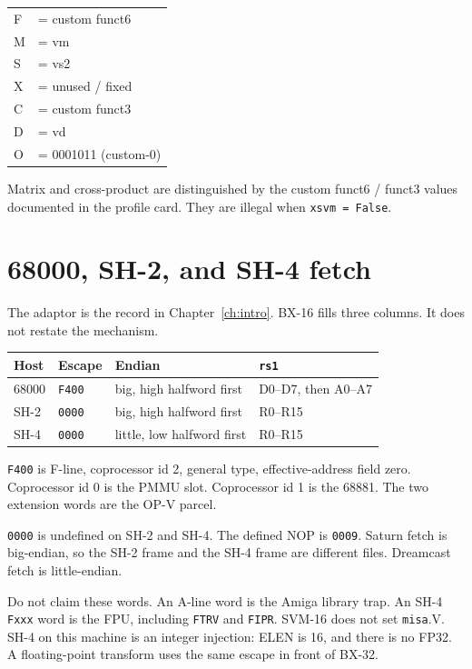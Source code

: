 \vspace{1.4ex}
\begin{center}
\begin{tabular}{@{}ll@{}}
F & = custom funct6 \\
M & = vm \\
S & = vs2 \\
X & = unused / fixed \\
C & = custom funct3 \\
D & = vd \\
O & = 0001011 (custom-0) \\
\end{tabular}
\end{center}

Matrix and cross-product are distinguished by the custom funct6 / funct3 values documented in the profile card. They are illegal when \texttt{xsvm = False}.

\section{68000, SH-2, and SH-4 fetch}

The adaptor is the record in Chapter~\ref{ch:intro}. BX-16 fills three columns. It does not restate the mechanism.

\begin{center}
\small
\begin{tabular}{@{}llll@{}}
\toprule
Host & Escape & Endian & \texttt{rs1} \\
\midrule
68000 & \texttt{F400} & big, high halfword first & D0--D7, then A0--A7 \\
SH-2 & \texttt{0000} & big, high halfword first & R0--R15 \\
SH-4 & \texttt{0000} & little, low halfword first & R0--R15 \\
\bottomrule
\end{tabular}
\end{center}

\texttt{F400} is F-line, coprocessor id 2, general type, effective-address field zero. Coprocessor id 0 is the PMMU slot. Coprocessor id 1 is the 68881. The two extension words are the OP-V parcel.

\texttt{0000} is undefined on SH-2 and SH-4. The defined NOP is \texttt{0009}. Saturn fetch is big-endian, so the SH-2 frame and the SH-4 frame are different files. Dreamcast fetch is little-endian.

Do not claim these words. An A-line word is the Amiga library trap. An SH-4 \texttt{Fxxx} word is the FPU, including \texttt{FTRV} and \texttt{FIPR}. SVM-16 does not set \texttt{misa}.V. SH-4 on this machine is an integer injection: ELEN is 16, and there is no FP32. A floating-point transform uses the same escape in front of BX-32.

